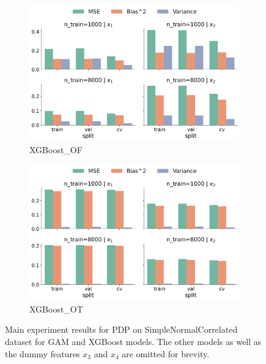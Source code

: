 \documentclass[runningheads]{llncs}
\begin{document}
\begin{figure}[ht!]
\begin{subfigure}[b]{0.49\textwidth}
        \includegraphics[width=\textwidth]{img/SNC/feature_effect_errors_pdp_XGBoost_OF.png}
        \caption{XGBoost\_OF}
        \label{fig:pdp-results-snc-xgboost-of}  %
    \end{subfigure}
    \hfill
    \begin{subfigure}[b]{0.49\textwidth}
        \includegraphics[width=\textwidth]{img/SNC/feature_effect_errors_pdp_XGBoost_OT.png}
        \caption{XGBoost\_OT}
        \label{fig:pdp-results-snc-xgboost-ot}  %
    \end{subfigure}
    \caption{Main experiment results for PDP on SimpleNormalCorrelated dataset for GAM and
        XGBoost models. The other models as well as the dummy features $x_3$ and $x_4$
        are omitted for brevity.}
    \label{fig:pdp-results-snc}  %
\end{figure}
\end{document}
